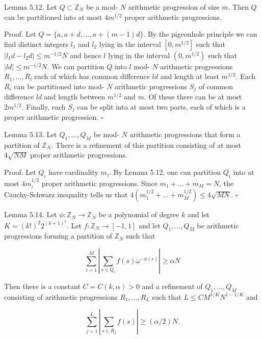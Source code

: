 \documentclass[10pt]{article}
\begin{document}
Lemma 5.12. Let $Q \subset \mathbb{Z}_{N}$ be a mod- $N$ arithmetic progression of size $m$. Then $Q$ can be partitioned into at most $4 m^{1 / 2}$ proper arithmetic progressions.

Proof. Let $Q=\{a, a+d, \ldots, a+(m-1) d\}$. By the pigeonhole principle we can find distinct integers $l_{1}$ and $l_{2}$ lying in the interval $\left[0, m^{1 / 2}\right]$ such that $\left|l_{1} d-l_{2} d\right| \leqslant m^{-1 / 2} N$ and hence $l$ lying in the interval $\left(0, m^{1 / 2}\right)$ such that $|l d| \leqslant m^{-1 / 2} N$. We can partition $Q$ into $l$ mod- $N$ arithmetic progressions $R_{1}, \ldots, R_{l}$ each of which has common difference $l d$ and length at least $m^{1 / 2}$. Each $R_{i}$ can be partitioned into mod- $N$ arithmetic progressions $S_{j}$ of common difference $l d$ and length between $m^{1 / 2}$ and $m$. Of these there can be at most $2 m^{1 / 2}$. Finally, each $S_{j}$ can be split into at most two parts, each of which is a proper arithmetic progression. \(\square\)

Lemma 5.13. Let $Q_{1}, \ldots, Q_{M}$ be mod- $N$ arithmetic progressions that form a partition of $\mathbb{Z}_{N}$. There is a refinement of this partition consisting of at most $4 \sqrt{N M}$ proper arithmetic progressions.

Proof. Let $Q_{i}$ have cardinality $m_{i}$. By Lemma 5.12, one can partition $Q_{i}$ into at most $4 m_{i}^{1 / 2}$ proper arithmetic progressions. Since $m_{1}+\ldots+m_{M}=N$, the Cauchy-Schwarz inequality tells us that $4\left(m_{1}^{1 / 2}+\ldots+m_{M}^{1 / 2}\right) \leqslant 4 \sqrt{M N}$. \(\square\)

Lemma 5.14. Let $\phi: \mathbb{Z}_{N} \rightarrow \mathbb{Z}_{N}$ be a polynomial of degree $k$ and let $K=(k!)^{2} 2^{(k+1)^{2}}$. Let $f: \mathbb{Z}_{N} \rightarrow[-1,1]$ and let $Q_{1}, \ldots, Q_{M}$ be arithmetic progressions forming a partition of $\mathbb Z_N$ such that

$$
\sum_{i=1}^{M}\left|\sum_{s \in Q_{i}} f(s) \omega^{-\phi(s)}\right| \geqslant \alpha N
$$

Then there is a constant $C=C(k,\alpha)>0$ and a refinement of $Q_{1}, \ldots, Q_{M}$ consisting of arithmetic progressions $R_{1}, \ldots, R_{L}$ such that $L \leqslant C M^{1 / K} N^{1-1 / K}$ and

$$
\sum_{j=1}^{L}\left|\sum_{s \in R_{j}} f(s)\right| \geqslant(\alpha / 2) N .
$$
\end{document}
